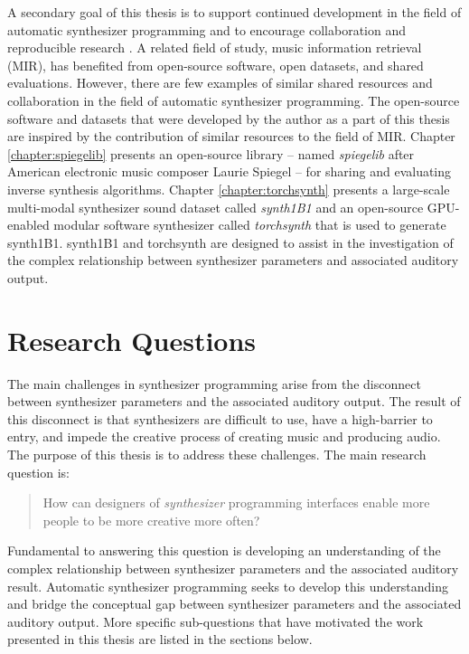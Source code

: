 A secondary goal of this thesis is to support continued development in the field of automatic synthesizer programming and to encourage collaboration and reproducible research \cite{vandewalle2009reproducible}. A related field of study, music information retrieval (MIR), has benefited from open-source software, open datasets, and shared evaluations.
However, there are few examples of similar shared resources and collaboration in the field of automatic synthesizer programming. The open-source software and datasets that were developed by the author as a part of this thesis are inspired by the contribution of similar resources to the field of MIR.  Chapter \ref{chapter:spiegelib} presents an open-source library -- named \textit{spiegelib} after American electronic music composer Laurie Spiegel -- for sharing and evaluating inverse synthesis algorithms. Chapter \ref{chapter:torchsynth} presents a large-scale multi-modal synthesizer sound dataset called \textit{synth1B1} and an open-source GPU-enabled modular software synthesizer called \textit{torchsynth} that is used to generate synth1B1. synth1B1 and torchsynth are designed to assist in the investigation of the complex relationship between synthesizer parameters and associated auditory output.


\section{Research Questions}
The main challenges in synthesizer programming arise from the disconnect between synthesizer parameters and the associated auditory output. The result of this disconnect is that synthesizers are difficult to use, have a high-barrier to entry, and impede the creative process of creating music and producing audio. The purpose of this thesis is to address these challenges. The main research question is:

\begin{quote}
    How can designers of \textit{synthesizer} programming interfaces enable more people to be more creative more often?
\end{quote}

Fundamental to answering this question is developing an understanding of the complex relationship between synthesizer parameters and the associated auditory result. Automatic synthesizer programming seeks to develop this understanding and bridge the conceptual gap between synthesizer parameters and the associated auditory output. More specific sub-questions that have motivated the work presented in this thesis are listed in the sections below.

